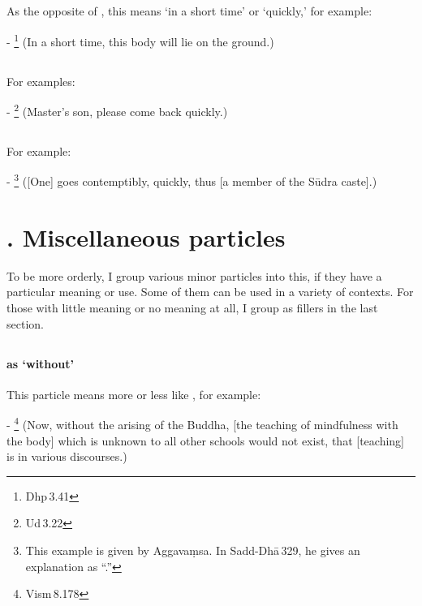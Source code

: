 \subsection*{}\label{nip:aciradm}
As the opposite of , this means `in a short time' or `quickly,' for example:\par
- \footnote{Dhp\,3.41} (In a short time, this body will lie on the ground.) \par

\subsection*{}\label{nip:tuvadtadm}
For examples:\par
- \footnote{Ud\,3.22} (Master's son, please come back quickly.) \par

\subsection*{}\label{nip:su}
For example:\par
- \footnote{This example is given by Aggava\d msa. In Sadd-Dh\=a\,329, he gives an explanation as ``.''} ([One] goes contemptibly, quickly, thus  [a member of the S\=udra caste].) \par

\label{nipgrp18}
\section*{. Miscellaneous particles}

To be more orderly, I group various minor particles into this, if they have a particular meaning or use. Some of them can be used in a variety of contexts. For those with little meaning or no meaning at all, I group as fillers in the last section.

\subsection*{}\label{nip:aynynatra}
\paragraph*{ as `without'} This particle means more or less like , for example:\par
- \footnote{Vism\,8.178} (Now, without the arising of the Buddha, [the teaching of mindfulness with the body] which is unknown to all other schools would not exist, that [teaching] is in various discourses.) \par

